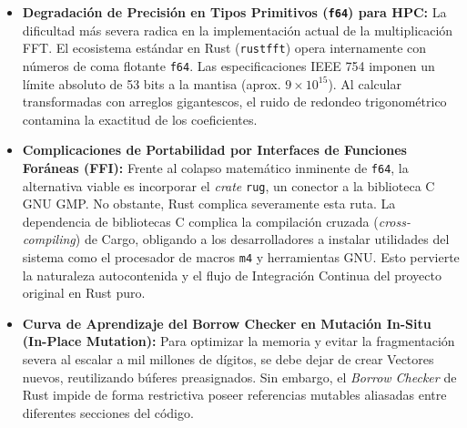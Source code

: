 \documentclass[12pt]{article}
\begin{document}
\begin{itemize}
    \item \textbf{Degradación de Precisión en Tipos Primitivos (\texttt{f64}) para HPC:} La dificultad más severa radica en la implementación actual de la multiplicación FFT. El ecosistema estándar en Rust (\texttt{rustfft}) opera internamente con números de coma flotante \texttt{f64}. Las especificaciones IEEE 754 imponen un límite absoluto de 53 bits a la mantisa (aprox. $9 \times 10^{15}$). Al calcular transformadas con arreglos gigantescos, el ruido de redondeo trigonométrico contamina la exactitud de los coeficientes. 

    \item \textbf{Complicaciones de Portabilidad por Interfaces de Funciones Foráneas (FFI):} Frente al colapso matemático inminente de \texttt{f64}, la alternativa viable es incorporar el \textit{crate} \texttt{rug}, un conector a la biblioteca C GNU GMP. No obstante, Rust complica severamente esta ruta. La dependencia de bibliotecas C complica la compilación cruzada (\textit{cross-compiling}) de Cargo, obligando a los desarrolladores a instalar utilidades del sistema como el procesador de macros \texttt{m4} y herramientas GNU. Esto pervierte la naturaleza autocontenida y el flujo de Integración Continua del proyecto original en Rust puro.

    \item \textbf{Curva de Aprendizaje del Borrow Checker en Mutación In-Situ (In-Place Mutation):} Para optimizar la memoria y evitar la fragmentación severa al escalar a mil millones de dígitos, se debe dejar de crear Vectores nuevos, reutilizando búferes preasignados. Sin embargo, el \textit{Borrow Checker} de Rust impide de forma restrictiva poseer referencias mutables aliasadas entre diferentes secciones del código. \end{itemize}
\end{document}
